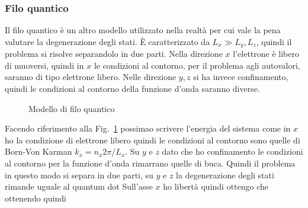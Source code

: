 \subsubsection{Filo quantico}
Il filo quantico è un altro modello utilizzato nella realtà per cui vale la pena valutare la degenerazione degli stati. \`E caratterizzato da $L_x \gg L_y,L_z$, quindi il problema si risolve  separandolo in due parti. Nella direzione $x$ l'elettrone è libero di muoversi, quindi in $x$ le condizioni al contorno, per il problema agli autovalori, saranno di tipo elettrone libero. Nelle direzione $y,z$ si ha invece confinamento, quindi le condizioni al contorno della funzione d'onda saranno diverse.
\begin{figure}
	\centering
	\caption{Modello di filo quantico}
	\label{FILO:Q}
\end{figure}
Facendo riferimento alla Fig.~\ref{FILO:Q} possimao scrivere l'energia del sistema come
in $x$ ho la condizione di elettrone libero quindi le condizioni al contorno sono quelle di Born-Von Karman $k_x = n_x 2\pi/L_x$. Su $y$ e $z$ dato che ho confinamento le condizioni al contorno per la funzione d'onda rimarrano quelle di buca. Quindi il problema in questo modo si separa in due parti, su $y$ e $z$ la degenerazione degli stati rimande uguale al quantum dot
Sull'asse $x$ ho libertà quindi ottengo che
ottenendo quindi
